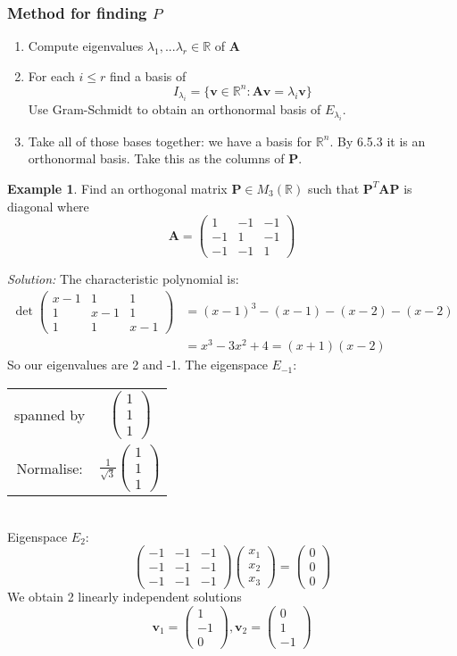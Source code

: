 \documentclass{report}
\theoremstyle{remark}
\theoremstyle{definition}
\theoremstyle{definition}
\newtheorem{example}[theorem]{Example}
\theoremstyle{theorem}
\renewcommand{\v}[1]{\mathbf{#1}}
\providecommand{\vectiii}[3]{\begin{pmatrix}#1\\#2\\#3\end{pmatrix}}
\begin{document}
\subsubsection{Method for finding $P$}
\begin{enumerate}[label=\textcircled{\tiny{\arabic*}}]
    \item Compute eigenvalues $\lambda_1,...\lambda_r \in \mathbb{R}$ of $\v{A}$
    \item For each $i \leq r$ find a basis of
    \[I_{\lambda_i} = \{\v{v}\in\mathbb{R}^n:\v{Av}=\lambda_i\v{v}\}\]
    Use Gram-Schmidt to obtain an orthonormal basis of $E_{\lambda_i}$.
    \item Take all of those bases together: we have a basis for $\mathbb{R}^n$. By 6.5.3 it is an orthonormal basis. Take this as the columns of $\v{P}$.
\end{enumerate}
\begin{example}
Find an orthogonal matrix $\v{P}\in M_3(\mathbb{R})$ such that $\v{P}^T\v{AP}$ is diagonal where
\[\v{A}=\begin{pmatrix}
1&-1&-1\\
-1&1&-1\\
-1&-1&1
\end{pmatrix}\]
\end{example}
\emph{Solution:} The characteristic polynomial is:
\begin{align*}
    \det\begin{pmatrix}
    x-1&1&1\\
    1&x-1&1\\
    1&1&x-1
    \end{pmatrix}&=(x-1)^3-(x-1)-(x-2)-(x-2)\\
    &=x^3-3x^2+4=(x+1)(x-2)
\end{align*}
So our eigenvalues are 2 and -1. The eigenspace $E_{-1}:$\\
\begin{tabular}{cc}
spanned by & $\vectiii{1}{1}{1}$\\
Normalise:&$\frac{1}{\sqrt{3}}\vectiii{1}{1}{1}$\\
\end{tabular}\\
Eigenspace $E_2$:
\[\begin{pmatrix}
-1&-1&-1\\
-1&-1&-1\\
-1&-1&-1
\end{pmatrix}\vectiii{x_1}{x_2}{x_3}=\vectiii{0}{0}{0}\]
We obtain 2 linearly independent solutions
\[\v{v}_1=\vectiii{1}{-1}{0}, \v{v}_2=\vectiii{0}{1}{-1}\]
\end{document}
